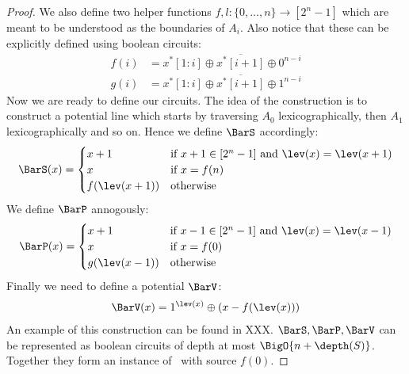 \begin{proof}
    We also define two helper functions $f, l : \{0, \dots, n\} \rightarrow [2^n -1]$ which are meant to be understood as the boundaries of $A_i$.
    Also notice that these can be explicitly defined using boolean circuits:
    \begin{align*}
        f(i) & = x^*[1:i] \oplus \overline{x^*[i+1]} \oplus 0^{n-i} \\
        g(i) & = x^*[1:i] \oplus \overline{x^*[i+1]} \oplus 1^{n-i}
    \end{align*}
    Now we are ready to define our circuits. The idea of the construction is to construct a potential line which starts by traversing $A_0$
    lexicographically, then $A_1$ lexicographically and so on.
    Hence we define $\BarS$ accordingly:
    \begin{align*}
        \BarS(x) = \begin{cases}
                       x+1          & \text{if } x+1 \in [2^n-1] \text{ and } \lev(x) = \lev(x+1) \\
                       x            & \text{if } x = f(n)                                         \\
                       f(\lev(x+1)) & \text{otherwise}
                   \end{cases}
    \end{align*}
    We define $\BarP$ annogously:
    \begin{align*}
        \BarP(x) = \begin{cases}
                       x+1          & \text{if } x-1 \in [2^n-1] \text{ and } \lev(x) = \lev(x-1) \\
                       x            & \text{if } x = f(0)                                         \\
                       g(\lev(x-1)) & \text{otherwise}
                   \end{cases}
    \end{align*}
    Finally we need to define a potential $\BarV$:
    \begin{align*}
        \BarV(x) = 1^{\lev(x)} \oplus (x - f(\lev(x)))
    \end{align*}
    An example of this construction can be found in XXX.
    $\BarS, \BarP, \BarV$ can be represented as boolean circuits of depth at most $\BigO{n + \depth(S)}$.
    Together they form an instance of \EOPL\ with source $f(0)$.
\end{proof}